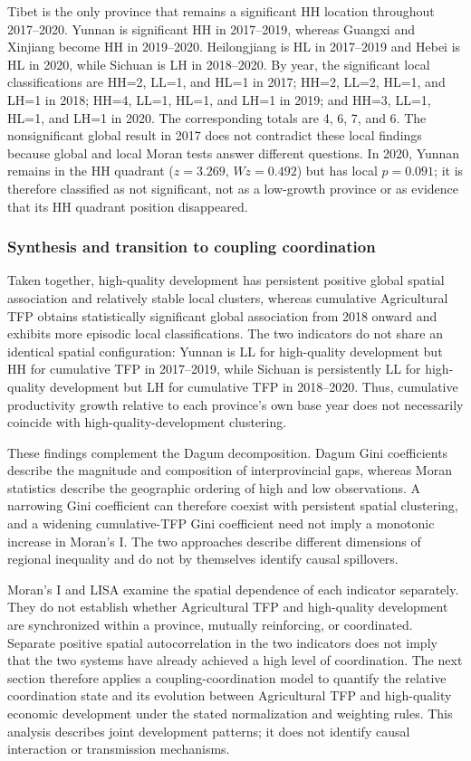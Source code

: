 \documentclass[sustainability,article,submit,moreauthors]{Definitions/mdpi}
\numberwithin{equation}{section}
\begin{document}
Tibet is the only province that remains a significant HH location throughout 2017--2020. Yunnan is significant HH in 2017--2019, whereas Guangxi and Xinjiang become HH in 2019--2020. Heilongjiang is HL in 2017--2019 and Hebei is HL in 2020, while Sichuan is LH in 2018--2020. By year, the significant local classifications are HH=2, LL=1, and HL=1 in 2017; HH=2, LL=2, HL=1, and LH=1 in 2018; HH=4, LL=1, HL=1, and LH=1 in 2019; and HH=3, LL=1, HL=1, and LH=1 in 2020. The corresponding totals are 4, 6, 7, and 6. The nonsignificant global result in 2017 does not contradict these local findings because global and local Moran tests answer different questions. In 2020, Yunnan remains in the HH quadrant ($z=3.269$, $Wz=0.492$) but has local $p=0.091$; it is therefore classified as not significant, not as a low-growth province or as evidence that its HH quadrant position disappeared.

\subsubsection{Synthesis and transition to coupling coordination}

Taken together, high-quality development has persistent positive global spatial association and relatively stable local clusters, whereas cumulative Agricultural TFP obtains statistically significant global association from 2018 onward and exhibits more episodic local classifications. The two indicators do not share an identical spatial configuration: Yunnan is LL for high-quality development but HH for cumulative TFP in 2017--2019, while Sichuan is persistently LL for high-quality development but LH for cumulative TFP in 2018--2020. Thus, cumulative productivity growth relative to each province's own base year does not necessarily coincide with high-quality-development clustering.

These findings complement the Dagum decomposition. Dagum Gini coefficients describe the magnitude and composition of interprovincial gaps, whereas Moran statistics describe the geographic ordering of high and low observations. A narrowing Gini coefficient can therefore coexist with persistent spatial clustering, and a widening cumulative-TFP Gini coefficient need not imply a monotonic increase in Moran's I. The two approaches describe different dimensions of regional inequality and do not by themselves identify causal spillovers.

Moran's I and LISA examine the spatial dependence of each indicator separately. They do not establish whether Agricultural TFP and high-quality development are synchronized within a province, mutually reinforcing, or coordinated. Separate positive spatial autocorrelation in the two indicators does not imply that the two systems have already achieved a high level of coordination. The next section therefore applies a coupling-coordination model to quantify the relative coordination state and its evolution between Agricultural TFP and high-quality economic development under the stated normalization and weighting rules. This analysis describes joint development patterns; it does not identify causal interaction or transmission mechanisms.
\end{document}
